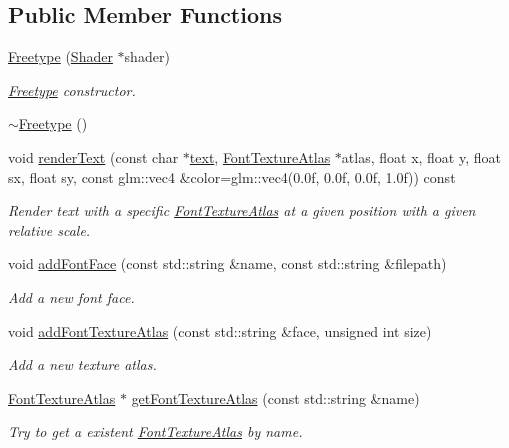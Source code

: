 \subsection*{Public Member Functions}
\begin{DoxyCompactItemize}
\item 
\mbox{\hyperlink{classec_1_1_freetype_a77da5cdd8b053a5fea7c5ffd78c39418}{Freetype}} (\mbox{\hyperlink{classec_1_1_shader}{Shader}} $\ast$shader)
\begin{DoxyCompactList}\small\item\em \mbox{\hyperlink{classec_1_1_freetype}{Freetype}} constructor. \end{DoxyCompactList}\item 
\mbox{\hyperlink{classec_1_1_freetype_a35e8fad09705600cdd263ed3781d299b}{$\sim$\+Freetype}} ()
\item 
void \mbox{\hyperlink{classec_1_1_freetype_afef1f61fa4bd8114825c66ac93d3e6bf}{render\+Text}} (const char $\ast$\mbox{\hyperlink{namespaceec_a0bdee24285d69deca899e166b29c0150}{text}}, \mbox{\hyperlink{classec_1_1_font_texture_atlas}{Font\+Texture\+Atlas}} $\ast$atlas, float x, float y, float sx, float sy, const glm\+::vec4 \&color=glm\+::vec4(0.\+0f, 0.\+0f, 0.\+0f, 1.\+0f)) const
\begin{DoxyCompactList}\small\item\em Render text with a specific \mbox{\hyperlink{classec_1_1_font_texture_atlas}{Font\+Texture\+Atlas}} at a given position with a given relative scale. \end{DoxyCompactList}\item 
void \mbox{\hyperlink{classec_1_1_freetype_a7a10e5515342b70588f76328ac83826d}{add\+Font\+Face}} (const std\+::string \&name, const std\+::string \&filepath)
\begin{DoxyCompactList}\small\item\em Add a new font face. \end{DoxyCompactList}\item 
void \mbox{\hyperlink{classec_1_1_freetype_a1be4b69e2d57689533ddaabdc9042d51}{add\+Font\+Texture\+Atlas}} (const std\+::string \&face, unsigned int size)
\begin{DoxyCompactList}\small\item\em Add a new texture atlas. \end{DoxyCompactList}\item 
\mbox{\hyperlink{classec_1_1_font_texture_atlas}{Font\+Texture\+Atlas}} $\ast$ \mbox{\hyperlink{classec_1_1_freetype_a3e0a8937ec0ceb33495598da59b2c4f3}{get\+Font\+Texture\+Atlas}} (const std\+::string \&name)
\begin{DoxyCompactList}\small\item\em Try to get a existent \mbox{\hyperlink{classec_1_1_font_texture_atlas}{Font\+Texture\+Atlas}} by name. \end{DoxyCompactList}\end{DoxyCompactItemize}


